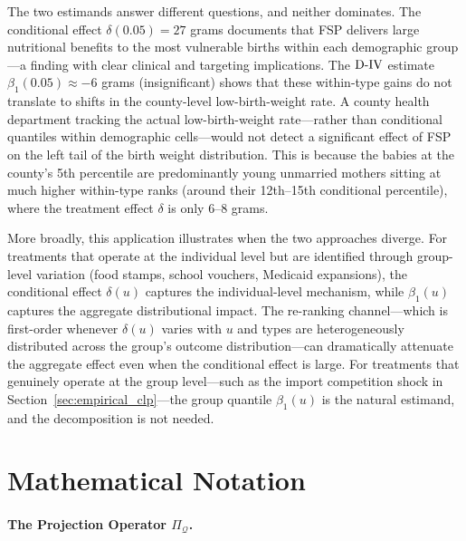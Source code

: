 \documentclass[12pt]{article}
\newcommand{\est}{\ensuremath{\textnormal{D-IV}}\xspace}
\begin{document}
The two estimands answer different questions, and neither dominates. The conditional effect $\delta(0.05) = 27$ grams documents that FSP delivers large nutritional benefits to the most vulnerable births within each demographic group---a finding with clear clinical and targeting implications. The \est estimate $\beta_1(0.05) \approx -6$ grams (insignificant) shows that these within-type gains do not translate to shifts in the county-level low-birth-weight rate. A county health department tracking the actual low-birth-weight rate---rather than conditional quantiles within demographic cells---would not detect a significant effect of FSP on the left tail of the birth weight distribution. This is because the babies at the county's 5th percentile are predominantly young unmarried mothers sitting at much higher within-type ranks (around their 12th--15th conditional percentile), where the treatment effect $\delta$ is only 6--8 grams.

More broadly, this application illustrates when the two approaches diverge. For treatments that operate at the individual level but are identified through group-level variation (food stamps, school vouchers, Medicaid expansions), the conditional effect $\delta(u)$ captures the individual-level mechanism, while $\beta_1(u)$ captures the aggregate distributional impact. The re-ranking channel---which is first-order whenever $\delta(u)$ varies with $u$ and types are heterogeneously distributed across the group's outcome distribution---can dramatically attenuate the aggregate effect even when the conditional effect is large. For treatments that genuinely operate at the group level---such as the import competition shock in Section~\ref{sec:empirical_clp}---the group quantile $\beta_1(u)$ is the natural estimand, and the decomposition is not needed.

\newpage




 
 

\appendix
\clearpage

\section{Mathematical Notation}
\paragraph{The Projection Operator \texorpdfstring{$\Pi_{\mathcal{Q}}$}{Pi Q}.}
\end{document}
